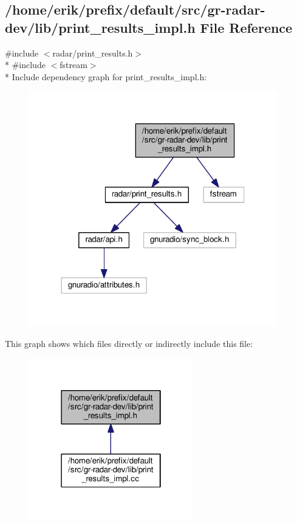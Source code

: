 \subsection{/home/erik/prefix/default/src/gr-\/radar-\/dev/lib/print\+\_\+results\+\_\+impl.h File Reference}
\label{print__results__impl_8h}
{\ttfamily \#include $<$radar/print\+\_\+results.\+h$>$}\\*
{\ttfamily \#include $<$fstream$>$}\\*
Include dependency graph for print\+\_\+results\+\_\+impl.\+h\+:
\nopagebreak
\begin{figure}[H]
\begin{center}
\leavevmode
\includegraphics[width=306pt]{d8/d3b/print__results__impl_8h__incl}
\end{center}
\end{figure}
This graph shows which files directly or indirectly include this file\+:
\nopagebreak
\begin{figure}[H]
\begin{center}
\leavevmode
\includegraphics[width=202pt]{da/dfc/print__results__impl_8h__dep__incl}
\end{center}
\end{figure}
